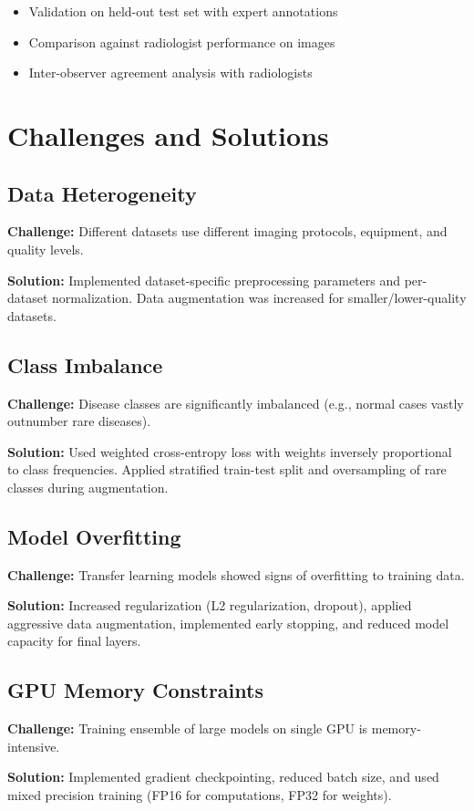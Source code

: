 {\begin{itemize}
    \item Validation on \underline{\hspace{2cm}} held-out test set with expert annotations
    \item Comparison against radiologist performance on \underline{\hspace{2cm}} images
    \item Inter-observer agreement analysis with \underline{\hspace{2cm}} radiologists
\end{itemize}

\section{Challenges and Solutions}

\subsection{Data Heterogeneity}

\textbf{Challenge:} Different datasets use different imaging protocols, equipment, and quality levels.

\textbf{Solution:} Implemented dataset-specific preprocessing parameters and per-dataset normalization. Data augmentation was increased for smaller/lower-quality datasets.

\subsection{Class Imbalance}

\textbf{Challenge:} Disease classes are significantly imbalanced (e.g., normal cases vastly outnumber rare diseases).

\textbf{Solution:} Used weighted cross-entropy loss with weights inversely proportional to class frequencies. Applied stratified train-test split and oversampling of rare classes during augmentation.

\subsection{Model Overfitting}

\textbf{Challenge:} Transfer learning models showed signs of overfitting to training data.

\textbf{Solution:} Increased regularization (L2 regularization, dropout), applied aggressive data augmentation, implemented early stopping, and reduced model capacity for final layers.

\subsection{GPU Memory Constraints}

\textbf{Challenge:} Training ensemble of large models on single GPU is memory-intensive.

\textbf{Solution:} Implemented gradient checkpointing, reduced batch size, and used mixed precision training (FP16 for computations, FP32 for weights).

}
